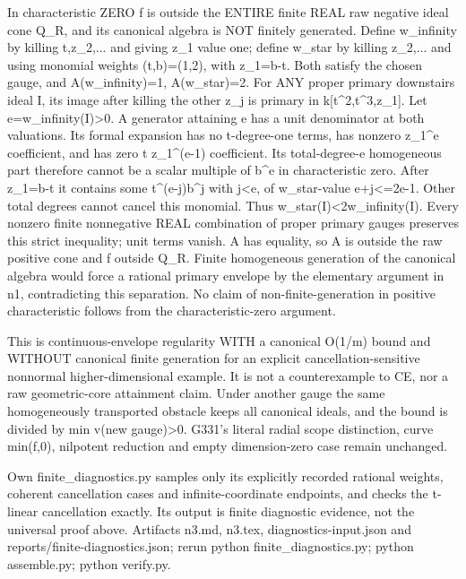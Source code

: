 \documentclass[11pt]{article}
\begin{document}
In characteristic ZERO f is outside the ENTIRE finite REAL raw negative ideal cone Q\_R, and its canonical algebra is NOT finitely generated. Define w\_infinity by killing t,z\_2,... and giving z\_1 value one; define w\_star by killing z\_2,... and using monomial weights (t,b)=(1,2), with z\_1=b-t. Both satisfy the chosen gauge, and A(w\_infinity)=1, A(w\_star)=2. For ANY proper primary downstairs ideal I, its image after killing the other z\_j is primary in k[t\textasciicircum{}2,t\textasciicircum{}3,z\_1]. Let e=w\_infinity(I)\textgreater{}0. A generator attaining e has a unit denominator at both valuations. Its formal expansion has no t-degree-one terms, has nonzero z\_1\textasciicircum{}e coefficient, and has zero t z\_1\textasciicircum{}(e-1) coefficient. Its total-degree-e homogeneous part therefore cannot be a scalar multiple of b\textasciicircum{}e in characteristic zero. After z\_1=b-t it contains some t\textasciicircum{}(e-j)b\textasciicircum{}j with j\textless{}e, of w\_star-value e+j\textless{}=2e-1. Other total degrees cannot cancel this monomial. Thus w\_star(I)\textless{}2w\_infinity(I). Every nonzero finite nonnegative REAL combination of proper primary gauges preserves this strict inequality; unit terms vanish. A has equality, so A is outside the raw positive cone and f outside Q\_R. Finite homogeneous generation of the canonical algebra would force a rational primary envelope by the elementary argument in n1, contradicting this separation. No claim of non-finite-generation in positive characteristic follows from the characteristic-zero argument.

This is continuous-envelope regularity WITH a canonical O(1/m) bound and WITHOUT canonical finite generation for an explicit cancellation-sensitive nonnormal higher-dimensional example. It is not a counterexample to CE, nor a raw geometric-core attainment claim. Under another gauge the same homogeneously transported obstacle keeps all canonical ideals, and the bound is divided by min v(new gauge)\textgreater{}0. G331's literal radial scope distinction, curve min(f,0), nilpotent reduction and empty dimension-zero case remain unchanged.

Own finite\_diagnostics.py samples only its explicitly recorded rational weights, coherent cancellation cases and infinite-coordinate endpoints, and checks the t-linear cancellation exactly. Its output is finite diagnostic evidence, not the universal proof above. Artifacts n3.md, n3.tex, diagnostics-input.json and reports/finite-diagnostics.json; rerun python finite\_diagnostics.py; python assemble.py; python verify.py.
\end{document}
